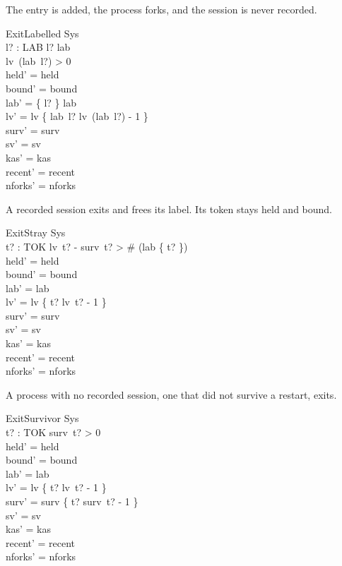 \documentclass[a4paper,10pt,fleqn]{article}
\begin{document}
The entry is added, the process forks, and the session is never recorded.

\begin{schema}{ExitLabelled}
  \Delta Sys \\
  l? : LAB
\where
  l? \in \dom lab \\
  lv~(lab~l?) > 0 \\
  held' = held \\
  bound' = bound \\
  lab' = \{ l? \} \ndres lab \\
  lv' = lv \oplus \{ lab~l? \mapsto lv~(lab~l?) - 1 \} \\
  surv' = surv \\
  sv' = sv \\
  kas' = kas \\
  recent' = recent \\
  nforks' = nforks
\end{schema}

A recorded session exits and frees its label. Its token stays held and bound.

\begin{schema}{ExitStray}
  \Delta Sys \\
  t? : TOK
\where
  lv~t? - surv~t? > \# (lab \rres \{ t? \}) \\
  held' = held \\
  bound' = bound \\
  lab' = lab \\
  lv' = lv \oplus \{ t? \mapsto lv~t? - 1 \} \\
  surv' = surv \\
  sv' = sv \\
  kas' = kas \\
  recent' = recent \\
  nforks' = nforks
\end{schema}

A process with no recorded session, one that did not survive a restart, exits.

\begin{schema}{ExitSurvivor}
  \Delta Sys \\
  t? : TOK
\where
  surv~t? > 0 \\
  held' = held \\
  bound' = bound \\
  lab' = lab \\
  lv' = lv \oplus \{ t? \mapsto lv~t? - 1 \} \\
  surv' = surv \oplus \{ t? \mapsto surv~t? - 1 \} \\
  sv' = sv \\
  kas' = kas \\
  recent' = recent \\
  nforks' = nforks
\end{schema}
\end{document}

